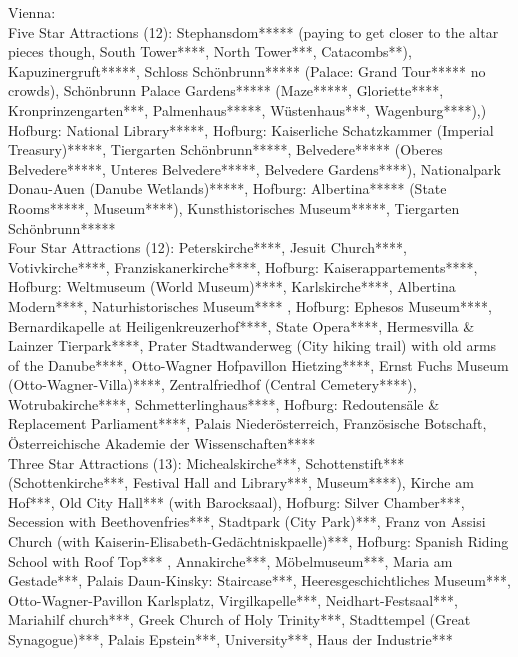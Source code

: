 
Vienna: \\
Five Star Attractions (12): Stephansdom***** (paying to get closer to the altar pieces though, South Tower****, North Tower***, Catacombs**), Kapuzinergruft*****, Schloss Sch\"onbrunn***** (Palace: Grand Tour***** no crowds), Sch\"onbrunn Palace Gardens***** (Maze*****, Gloriette****, Kronprinzengarten***, Palmenhaus*****, W\"ustenhaus***, Wagenburg****),) Hofburg: National Library*****, Hofburg: Kaiserliche Schatzkammer (Imperial Treasury)*****, Tiergarten Sch\"onbrunn*****, Belvedere***** (Oberes Belvedere*****, Unteres Belvedere*****, Belvedere Gardens****), Nationalpark Donau-Auen (Danube Wetlands)*****, Hofburg: Albertina***** (State Rooms*****, Museum****),  Kunsthistorisches Museum*****, Tiergarten Sch\"onbrunn*****\\

Four Star Attractions (12): Peterskirche****, Jesuit Church****, Votivkirche****, Franziskanerkirche****, Hofburg: Kaiserappartements****, Hofburg: Weltmuseum (World Museum)****, Karlskirche****, Albertina Modern****, Naturhistorisches Museum**** , Hofburg: Ephesos Museum****, Bernardikapelle at Heiligenkreuzerhof****, State Opera****, Hermesvilla \& Lainzer Tierpark****, Prater Stadtwanderweg (City hiking trail) with old arms of the Danube****, Otto-Wagner Hofpavillon Hietzing****, Ernst Fuchs Museum (Otto-Wagner-Villa)****, Zentralfriedhof (Central Cemetery****), Wotrubakirche****, Schmetterlinghaus****, Hofburg: Redoutens\"ale \& Replacement Parliament****, Palais Nieder\"osterreich, Franz\"osische Botschaft, \"Osterreichische Akademie der Wissenschaften****\\ 

Three Star Attractions (13):  Michealskirche***, Schottenstift*** (Schottenkirche***, Festival Hall and Library***, Museum****), Kirche am Hof***, Old City Hall*** (with Barocksaal), Hofburg: Silver Chamber***,  Secession with Beethovenfries***, Stadtpark (City Park)***, Franz von Assisi Church (with Kaiserin-Elisabeth-Ged\"achtniskpaelle)***, Hofburg: Spanish Riding School with Roof Top*** , Annakirche***, M\"obelmuseum***, Maria am Gestade***, Palais Daun-Kinsky: Staircase***, Heeresgeschichtliches Museum***, Otto-Wagner-Pavillon Karlsplatz, Virgilkapelle***, Neidhart-Festsaal***, Mariahilf church***, Greek Church of Holy Trinity***, Stadttempel (Great Synagogue)***, Palais Epstein***, University***, Haus der Industrie***\\

